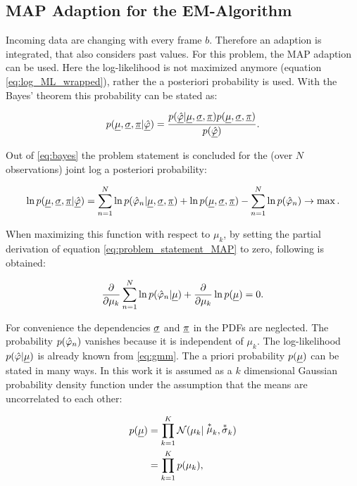 \subsection{MAP Adaption for the EM-Algorithm}
Incoming data are changing with every frame $b$. Therefore an adaption is integrated, that also considers past values. For this problem, the MAP adaption can be used. Here the log-likelihood is not maximized anymore (equation \ref{eq:log_ML_wrapped}), rather the a posteriori probability is used. With the Bayes' theorem this probability can be stated as:

\begin{equation}
p(\underline{\mu}, \underline{\sigma}, \underline{\pi}|\underline{\hat{\varphi}}) = \frac{p(\underline{\hat{\varphi}}|\underline{\mu}, \underline{\sigma}, \underline{\pi})p(\underline{\mu}, \underline{\sigma}, \underline{\pi})}{p(\underline{\hat{\varphi}})}.
\label{eq:bayes}
\end{equation}

Out of \ref{eq:bayes} the problem statement is concluded for the (over $N$ observations) joint log a posteriori probability:

\begin{equation}
\ln p(\underline{\mu}, \underline{\sigma}, \underline{\pi}|\underline{\hat{\varphi}}) = \sum^{N}_{n=1} \ln p(\hat{\varphi}_n|\underline{\mu}, \underline{\sigma}, \underline{\pi})+ \ln p(\underline{\mu}, \underline{\sigma}, \underline{\pi})- \sum^{N}_{n=1} \ln p(\hat{\varphi}_n) \rightarrow \max.
\label{eq:problem_statement_MAP}
\end{equation}

When maximizing this function with respect to $\mu_k$, by setting the partial derivation of equation \ref{eq:problem_statement_MAP} to zero, following is obtained:

\begin{equation}
\frac{\partial}{\partial\mu_k} \sum^{N}_{n=1}\ln p(\hat{\varphi}_n|\underline{\mu})+ \frac{\partial}{\partial\mu_k} \ln p(\underline{\mu}) = 0.
\label{eq:deriv_MAP}
\end{equation}

For convenience the dependencies $\underline{\sigma}$ and $\underline{\pi}$ in the \acp{PDF} are neglected. The probability $p(\hat{\varphi}_n)$ vanishes because it is independent of $\mu_k$. The log-likelihood $p(\hat{\varphi}|\underline{\mu})$ is already known from \ref{eq:gmm}. The a priori probability $p(\underline{\mu})$ can be stated in many ways. In this work it is assumed as a $k$ dimensional Gaussian probability density function under the assumption that the means are uncorrelated to each other:

\begin{equation}
\begin{split}
p(\vect \mu) &= \prod_{k=1}^K\mathcal{N}(\mu_k|\oast\mu_k,\oast\sigma_k)\\
			 &= \prod_{k=1}^K p(\mu_k),
\end{split}
\label{eq:p_a_priori}
\end{equation}

